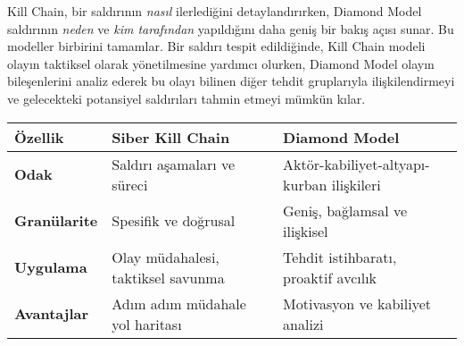 Kill Chain, bir saldırının \textit{nasıl} ilerlediğini detaylandırırken, Diamond Model saldırının \textit{neden} ve \textit{kim tarafından} yapıldığını daha geniş bir bakış açısı sunar. Bu modeller birbirini tamamlar. Bir saldırı tespit edildiğinde, Kill Chain modeli olayın taktiksel olarak yönetilmesine yardımcı olurken, Diamond Model olayın bileşenlerini analiz ederek bu olayı bilinen diğer tehdit gruplarıyla ilişkilendirmeyi ve gelecekteki potansiyel saldırıları tahmin etmeyi mümkün kılar.

\begin{longtable}{|p{3cm}|p{5.5cm}|p{5.5cm}|}
\hline
\textbf{Özellik} & \textbf{Siber Kill Chain} & \textbf{Diamond Model} \\
\hline
\textbf{Odak} & Saldırı aşamaları ve süreci & Aktör-kabiliyet-altyapı-kurban ilişkileri \\
\hline
\textbf{Granülarite} & Spesifik ve doğrusal & Geniş, bağlamsal ve ilişkisel \\
\hline
\textbf{Uygulama} & Olay müdahalesi, taktiksel savunma & Tehdit istihbaratı, proaktif avcılık \\
\hline
\textbf{Avantajlar} & Adım adım müdahale yol haritası & Motivasyon ve kabiliyet analizi \\
\hline
\end{longtable}
